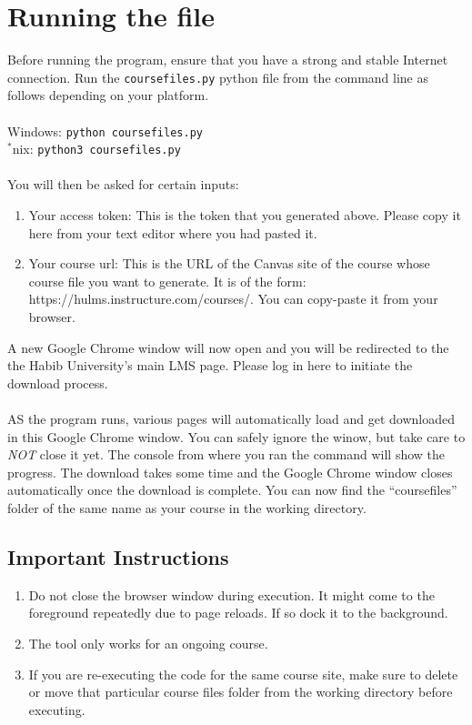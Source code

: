\documentclass{article}
\begin{document}
\section{Running the file}

Before running the program, ensure that you have a strong and stable
Internet connection. Run the \texttt{coursefiles.py} python file from
the command line as follows depending on your platform.
\\\\Windows: \texttt{python\ coursefiles.py}\\
$^*$nix: \texttt{python3\ coursefiles.py}\\\\
You will then be asked for certain inputs: 

\begin{enumerate}
\def\labelenumi{\arabic{enumi}.}
\item Your access token: This is
the token that you generated above. Please copy it here from your text
editor where you had pasted it. 
\item Your course url: This is the URL of
the Canvas site of the course whose course file you want to generate. It is of the form: https://hulms.instructure.com/courses/. You can
copy-paste it from your browser.
\end{enumerate}

A new Google Chrome window will now open and you will be redirected to
the the Habib University's main LMS page. Please log in here to initiate
the download process.
\\\\AS the program runs, various pages will automatically load and get
downloaded in this Google Chrome window. You can safely ignore the
winow, but take care to \emph{NOT} close it yet. The console from where
you ran the command will show the progress. The download takes some time
and the Google Chrome window closes automatically once the download is
complete. You can now find the ``coursefiles'' folder of the same name
as your course in the working directory.

\subsection{Important Instructions}

\begin{enumerate}
\def\labelenumi{\arabic{enumi}.}
\item
  Do not close the browser window during execution. It might come to the
  foreground repeatedly due to page reloads. If so dock it to the
  background.
\item
  The tool only works for an ongoing course.
  \item If you are re-executing the code for the same course site, make sure to delete or move that particular course files folder from the working directory before executing.
\end{enumerate}
\end{document}
